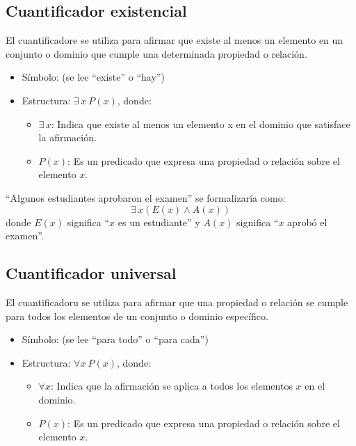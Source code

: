 \subsection{Cuantificador existencial}  
El \gls{cuantificadore} se utiliza para afirmar que existe al menos un elemento en un conjunto o dominio que cumple una determinada propiedad o relación.
\begin{itemize}
	\item Símbolo:  (se lee ``existe'' o ``hay'')
	\item Estructura: $\exists \, x \ P(x)$, donde:
	\begin{itemize}
		\item $\exists \, x$: Indica que existe al menos un elemento x en el dominio que satisface la afirmación.
		\item $P(x)$: Es un predicado que expresa una propiedad o relación sobre el elemento $x$.
	\end{itemize}
\end{itemize}

\begin{fmd-example}
	``Algunos estudiantes aprobaron el examen'' se formalizaría como: \[\exists \, x \left( E(x) \land A(x) \right)\] donde $E(x)$ significa ``$x$ es un estudiante'' y $A(x)$ significa ``$x$ aprobó el examen''.
\end{fmd-example}

\subsection{Cuantificador universal}
 
El \gls{cuantificadoru} se utiliza para afirmar que una propiedad o relación se cumple para todos los elementos de un conjunto o dominio específico.

\begin{itemize}
	\item Símbolo:  (se lee ``para todo'' o ``para cada'')
	\item Estructura: $\forall x \ P(x)$, donde:
	\begin{itemize}
		\item $\forall x$: Indica que la afirmación se aplica a todos los elementos $x$ en el dominio.
		\item $P(x)$: Es un predicado que expresa una propiedad o relación sobre el elemento $x$.
	\end{itemize}
\end{itemize}

